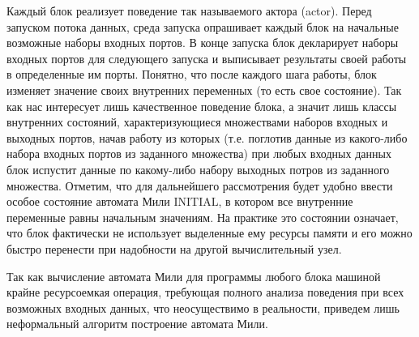 \documentclass[10pt,a4paper]{article}
\newcommand{\initial}{\text{INITIAL}}
\begin{document}
Каждый блок реализует поведение так называемого актора (actor).
Перед запуском потока данных, среда запуска опрашивает каждый блок на начальные возможные наборы входных портов.
В конце запуска блок декларирует наборы входных портов для следующего запуска и выписывает результаты своей работы в определенные им порты.
Понятно, что после каждого шага работы, блок изменяет значение своих внутренних переменных (то есть свое состояние). Так как нас интересует лишь качественное поведение блока,
а значит лишь классы внутренних состояний, характеризующиеся множествами наборов входных и выходных портов,
начав работу из которых (т.е. поглотив данные из какого-либо набора входных портов из заданного множества)
при любых входных данных блок испустит данные по какому-либо набору выходных потров из заданного множества.
Отметим, что для дальнейшего рассмотрения будет удобно ввести особое состояние автомата Мили $\initial$, в котором все внутренние переменные равны начальным значениям.
На практике это состоянии означает, что блок фактически не использует выделенные ему ресурсы памяти и его можно быстро перенести при надобности на другой вычислительный узел.

Так как вычисление автомата Мили для программы любого блока машиной крайне ресурсоемкая операция, требующая полного анализа поведения при всех возможных входных данных,
что неосуществимо в реальности, приведем лишь неформальный алгоритм построение автомата Мили.
\end{document}
